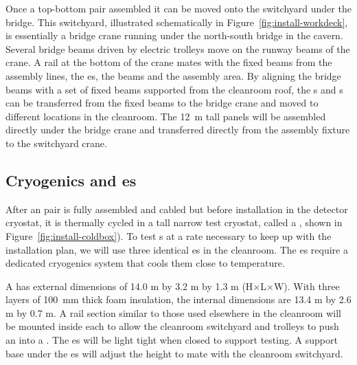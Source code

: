 Once a top-bottom  pair assembled it can be moved onto the switchyard under the bridge. 
This switchyard, illustrated schematically in Figure~\ref{fig:install-workdeck}, is essentially a bridge crane running under the %
north-south bridge in the cavern.  
Several bridge beams driven by electric trolleys  move on the runway beams of the crane.  
A rail at the bottom of the crane mates %
with the fixed beams  from the assembly lines, the \coldbox{}es, the  beams and the  assembly area.
By aligning the bridge beams with a set of fixed beams supported from the cleanroom roof, the s and s can be transferred from the fixed beams to the bridge crane and moved to different locations in the cleanroom. 
The \SI{12}{m} tall  panels will be assembled directly under the bridge crane and transferred directly from the assembly fixture to the switchyard crane.

\subsection{Cryogenics and \Coldbox{}es}
\label{sec:fdsp-tc-infr-cryo}



After an  pair is fully assembled and cabled but before installation in the detector cryostat, it is thermally cycled in a tall narrow test cryostat, called a \coldbox{}, shown in Figure~\ref{fig:install-coldbox}). 
To test s at a rate necessary to keep up with the installation plan, we will use three identical \coldbox{}es in the cleanroom. 
The \coldbox{}es require a dedicated cryogenics system that cools them  close to  temperature. 


A \coldbox has external dimensions of 14.0 \si{m} by 3.2 \si{m} by 1.3 \si{m} (H$\times$L$\times$W). With three layers of \SI{100}{mm} thick foam insulation,  
the internal dimensions are 13.4 \si{m} by 2.6 \si{m} by 0.7 \si{m}. A rail section similar to those used elsewhere in the cleanroom will be mounted inside each \coldbox to allow the cleanroom switchyard and trolleys to push an    into a \coldbox. The \coldbox{}es will be light tight when closed to support  testing. A support base under the \coldbox{}es will adjust the height to mate with the cleanroom switchyard.


